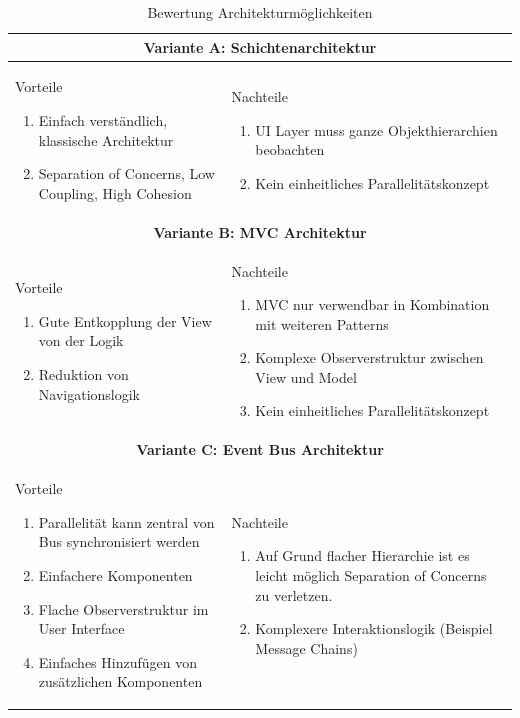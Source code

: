 \begin{table}[H]
\begin{tabular}{|p{}|p{}|}
 \hline 
\multicolumn{2}{|c|}{\textbf{Variante A: Schichtenarchitektur}}\\ \hline 
Vorteile
\begin{enumerate}
\item Einfach verständlich, klassische Architektur
\item Separation of Concerns, Low Coupling, High Cohesion
\end{enumerate} & 
Nachteile
\begin{enumerate}
\item \ac{UI} Layer muss ganze Objekthierarchien beobachten
\item Kein einheitliches Parallelitätskonzept
\end{enumerate}
\\ \hline

\multicolumn{2}{|c|}{\textbf{Variante B: MVC Architektur}}\\ \hline 
Vorteile
\begin{enumerate}
\item Gute Entkopplung der View von der Logik
\item Reduktion von Navigationslogik
\end{enumerate} &
Nachteile
\begin{enumerate}
\item \ac{MVC} nur verwendbar in Kombination mit weiteren Patterns
\item Komplexe Observerstruktur zwischen View und Model
\item Kein einheitliches Parallelitätskonzept
\end{enumerate}
\\ \hline

\multicolumn{2}{|c|}{\textbf{Variante C: Event Bus Architektur}}\\ \hline 
Vorteile
\begin{enumerate}
\item Parallelität kann zentral von Bus synchronisiert werden
\item Einfachere Komponenten
\item Flache Observerstruktur im User Interface
\item Einfaches Hinzufügen von zusätzlichen Komponenten
\end{enumerate} &
Nachteile
\begin{enumerate}
\item Auf Grund flacher Hierarchie ist es leicht möglich Separation of Concerns zu verletzen.
\item Komplexere Interaktionslogik (Beispiel Message Chains)
\end{enumerate}
\\ \hline
\end{tabular}
\caption{Bewertung Architekturmöglichkeiten}
\end{table}

